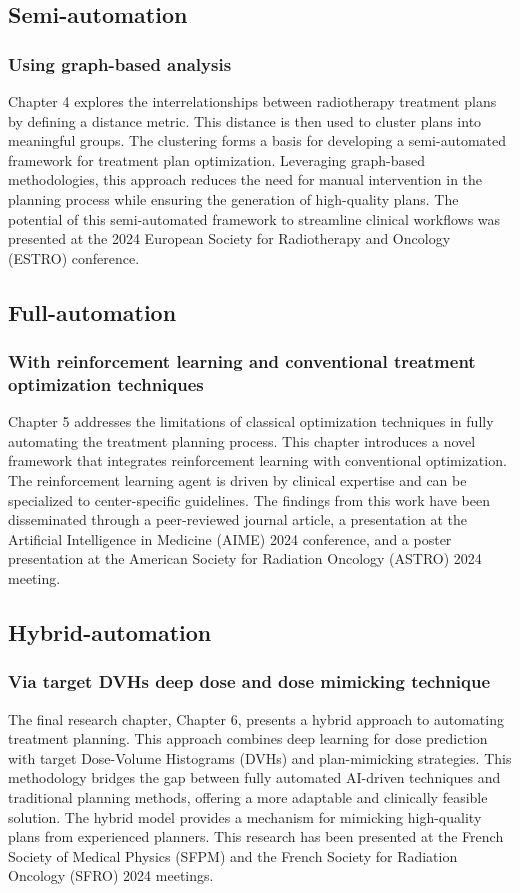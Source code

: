 \subsection{Semi-automation}
\subsubsection*{Using graph-based analysis}
Chapter 4 explores the interrelationships between radiotherapy treatment plans by defining a distance metric.
This distance is then used to cluster plans into meaningful groups.
The clustering forms a basis for developing a semi-automated framework for treatment plan optimization.
Leveraging graph-based methodologies, this approach reduces the need for manual intervention in the planning process while ensuring the generation of high-quality plans.
The potential of this semi-automated framework to streamline clinical workflows was presented at the 2024 European Society for Radiotherapy and Oncology (ESTRO) conference.

\subsection{Full-automation}
\subsubsection*{With reinforcement learning and conventional treatment optimization techniques}
Chapter 5 addresses the limitations of classical optimization techniques in fully automating the treatment planning process.
This chapter introduces a novel framework that integrates reinforcement learning with conventional optimization.
The reinforcement learning agent is driven by clinical expertise and can be specialized to center-specific guidelines.
The findings from this work have been disseminated through a peer-reviewed journal article, a presentation at the Artificial Intelligence in Medicine (AIME) 2024 conference, and a poster presentation at the American Society for Radiation Oncology (ASTRO) 2024 meeting.

\subsection{Hybrid-automation}
\subsubsection*{Via target DVHs deep dose and dose mimicking technique}
The final research chapter, Chapter 6, presents a hybrid approach to automating treatment planning.
This approach combines deep learning for dose prediction with target Dose-Volume Histograms (DVHs) and plan-mimicking strategies.
This methodology bridges the gap between fully automated AI-driven techniques and traditional planning methods, offering a more adaptable and clinically feasible solution.
The hybrid model provides a mechanism for mimicking high-quality plans from experienced planners.
This research has been presented at the French Society of Medical Physics (SFPM) and the French Society for Radiation Oncology (SFRO) 2024 meetings.
